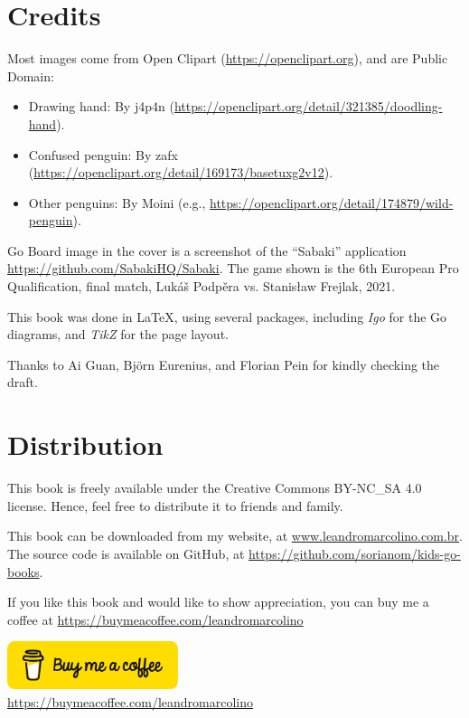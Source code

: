 \documentclass[a4paper,12pt]{extarticle}
\begin{document}
\section*{Credits}
Most images come from Open Clipart (\url{https://openclipart.org}), and are Public Domain:

\vspace{0.25cm}

\noindent\hspace{-0.5cm}\begin{minipage}{10cm}
\begin{itemize}
\item Drawing hand: By j4p4n (\url{https://openclipart.org/detail/321385/doodling-hand}).
\item Confused penguin: By zafx (\url{https://openclipart.org/detail/169173/basetuxg2v12}).
\item Other penguins: By Moini (e.g., \url{https://openclipart.org/detail/174879/wild-penguin}).
\end{itemize}
\end{minipage}

\vspace{0.25cm}

Go Board image in the cover is a screenshot of the ``Sabaki'' application \url{https://github.com/SabakiHQ/Sabaki}. The game shown is the 6th European Pro Qualification, final match, Lukáš Podpěra vs. Stanisław Frejlak, 2021.

This book was done in \LaTeX, using several packages, including \emph{Igo} for the Go diagrams, and \emph{TikZ} for the page layout.

Thanks to Ai Guan, Björn Eurenius, and Florian Pein for kindly checking the draft.

\section*{Distribution}

This book is freely available under the Creative Commons BY-NC\_SA 4.0 license. Hence, feel free to distribute it to friends and family.

This book can be downloaded from my website, at \url{www.leandromarcolino.com.br}. The source code is available on GitHub, at \url{https://github.com/sorianom/kids-go-books}.

If you like this book and would like to show appreciation, you can buy me a coffee at \url{https://buymeacoffee.com/leandromarcolino}

\begin{center}
  \href{https://buymeacoffee.com/leandromarcolino}{\includegraphics[width=5.0cm]{imgs/bmc-button.png}}\\
  \url{https://buymeacoffee.com/leandromarcolino}
\end{center}
\end{document}
